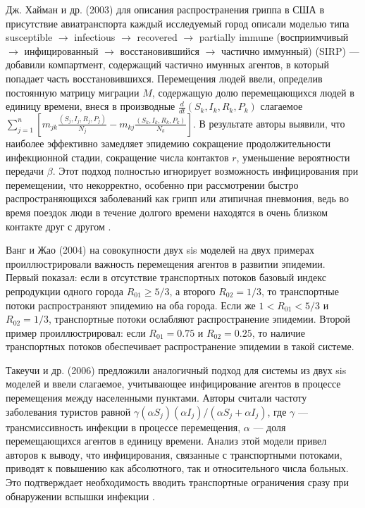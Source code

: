 \documentclass[a4paper,12pt]{article} %
\begin{document}
Дж. Хайман и др. (2003) \cite{hyman2003modeling} для описания распространения гриппа в США в присутствие авиатранспорта каждый исследуемый город описали моделью типа susceptible $\rightarrow$ infectious $\rightarrow$ recovered $\rightarrow$ partially immune (восприимчивый $\rightarrow$ инфицированный $\rightarrow$ восстановившийся $\rightarrow$ частично иммунный) (SIRP) --- добавили компартмент, содержащий частично имунных агентов, в который попадает часть восстановившихся. Перемещения людей ввели, определив постоянную матрицу миграции $M$, содержащую долю перемещающихся людей в единицу времени, внеся в производные $\frac{d}{dt}(S_k,I_k,R_k,P_k)$ слагаемое $\sum\limits_{j=1}^n \left[m_{jk}\frac{(S_j,I_j,R_j,P_j)}{N_j}-m_{kj}\frac{(S_k,I_k,R_k,P_k)}{N_k}\right]$. В результате авторы выявили, что наиболее эффективно замедляет эпидемию сокращение продолжительности инфекционной стадии, сокращение числа контактов $r$, уменьшение вероятности передачи $\beta$. Этот подход полностью игнорирует возможность инфицирования при перемещении, что некорректно, особенно при рассмотрении быстро распространяющихся заболеваний как грипп или атипичная пневмония, ведь во время поездок люди в течение долгого времени находятся в очень близком контакте друг с другом \cite{li2021modeling}.

Ванг и Жао (2004) \cite{wang2004epidemic} на совокупности двух \gls{sis} моделей на двух примерах проиллюстрировали важность перемещения агентов в развитии эпидемии. Первый показал: если в отсутствие транспортных потоков базовый индекс репродукции одного города $R_{01}\geqslant 5/3$, а второго $R_{02} = 1/3$, то транспортные потоки распространяют эпидемию на оба города. Если же $1 < R_{01} < 5/3$ и $R_{02} = 1/3$, транспортные потоки ослабляют распространение эпидемии. Второй пример проиллюстрировал: если $R_{01} = 0.75$ и $R_{02} = 0.25$, то наличие транспортных потоков обеспечивает распространение эпидемии в такой системе.

Такеучи и др. (2006) \cite{takeuchi2006spreading} предложили аналогичный подход для системы из двух \gls{sis} моделей и ввели слагаемое, учитывающее инфицирование агентов в процессе перемещения между населенными пунктами. Авторы считали частоту заболевания туристов равной $\gamma(\alpha S_j)(\alpha I_j)/(\alpha S_j+\alpha I_j)$, где $\gamma$ --- трансмиссивность инфекции в процессе перемещения, $\alpha$ --- доля перемещающихся агентов в единицу времени. Анализ этой модели привел авторов к выводу, что инфицирования, связанные с транспортными потоками, приводят к повышению как абсолютного, так и относительного числа больных. Это подтверждает необходимость вводить транспортные ограничения сразу при обнаружении вспышки инфекции \cite{takeuchi2006spreading}.
\end{document}
